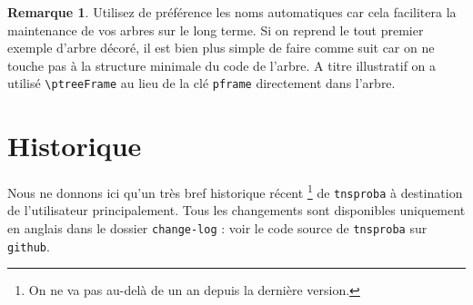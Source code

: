 \documentclass[12pt,a4paper]{article}
\newcommand\env[1]{\texttt{#1}}
\newcommand\macro[1]{\env{\textbackslash{}#1}}
\theoremstyle{definition}
\newtheorem*{remark}{Remarque}
\begin{document}
\begin{remark}
	Utilisez de préférence les noms automatiques car cela facilitera la maintenance de vos arbres sur le long terme.
	Si on reprend le tout premier exemple d'arbre décoré, il est bien plus simple de faire comme suit car on ne touche pas à la structure minimale du code de l'arbre.
	A titre illustratif on a utilisé \macro{ptreeFrame} au lieu de la clé \verb#pframe# directement dans l'arbre.
	
\end{remark}
\newpage

\section{Historique}

Nous ne donnons ici qu'un très bref historique récent
\footnote{
	On ne va pas au-delà de un an depuis la dernière version.
}
de \verb+tnsproba+ à destination de l'utilisateur principalement.
Tous les changements sont disponibles uniquement en anglais dans le dossier \verb+change-log+ : voir le code source de \verb+tnsproba+ sur \verb+github+.
\end{document}
